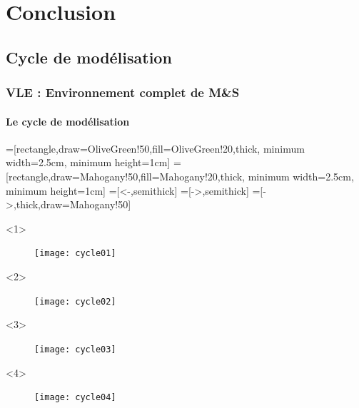 \documentclass[xetex, compress, table, svgnames]{beamer}
\begin{document}
\section{Conclusion}

\subsection{Cycle de modélisation}

\begin{frame}
  \frametitle{VLE : Environnement complet de M\&S}
  \framesubtitle{Le cycle de modélisation}
  \begin{center}
    =[rectangle,draw=OliveGreen!50,fill=OliveGreen!20,thick,
    minimum width=2.5cm, minimum height=1cm]
    =[rectangle,draw=Mahogany!50,fill=Mahogany!20,thick,
    minimum width=2.5cm, minimum height=1cm]
    =[<-,semithick]
    =[->,semithick]
    =[->,thick,draw=Mahogany!50]
    \begin{onlyenv}<1>
      \begin{figure}[htpb]
        \begin{center}
          \texttt{[image: cycle01]}
        \end{center}
      \end{figure}
    \end{onlyenv}
    \begin{onlyenv}<2>
      \begin{figure}[htpb]
        \begin{center}
          \texttt{[image: cycle02]}
        \end{center}
      \end{figure}
    \end{onlyenv}
    \begin{onlyenv}<3>
      \begin{figure}[htpb]
        \begin{center}
          \texttt{[image: cycle03]}
        \end{center}
      \end{figure}
    \end{onlyenv}
    \begin{onlyenv}<4>
      \begin{figure}[htpb]
        \begin{center}
          \texttt{[image: cycle04]}
        \end{center}
      \end{figure}
    \end{onlyenv}

\end{center}
\end{frame}
\end{document}
